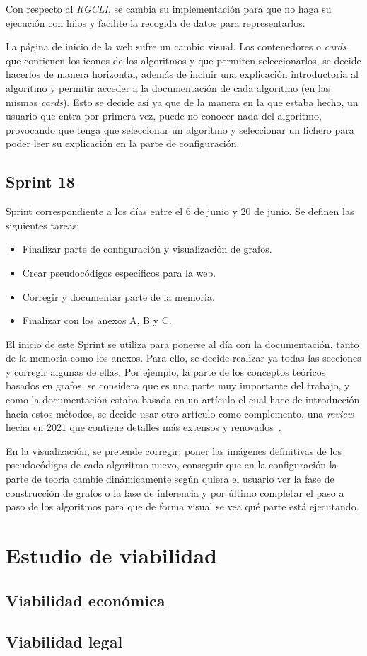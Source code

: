 Con respecto al \textit{RGCLI}, se cambia su implementación para que no haga su ejecución con hilos y facilite la recogida de datos para representarlos.

La página de inicio de la web sufre un cambio visual. Los contenedores o \textit{cards} que contienen los iconos de los algoritmos y que permiten seleccionarlos, se decide hacerlos de manera horizontal, además de incluir una explicación introductoria al algoritmo y permitir acceder a la documentación de cada algoritmo (en las mismas \textit{cards}). Esto se decide así ya que de la manera en la que estaba hecho, un usuario que entra por primera vez, puede no conocer nada del algoritmo, provocando que tenga que seleccionar un algoritmo y seleccionar un fichero para poder leer su explicación en la parte de configuración.

\subsection{Sprint 18}
Sprint correspondiente a los días entre el 6 de junio y 20 de junio. Se definen las siguientes tareas:
\begin{itemize}
	\item Finalizar parte de configuración y visualización de grafos.
	\item Crear pseudocódigos específicos para la web.
	\item Corregir y documentar parte de la memoria.
	\item Finalizar con los anexos A, B y C.
\end{itemize}

El inicio de este Sprint se utiliza para ponerse al día con la documentación, tanto de la memoria como los anexos. Para ello, se decide realizar ya todas las secciones y corregir algunas de ellas. Por ejemplo, la parte de los conceptos teóricos basados en grafos, se considera que es una parte muy importante del trabajo, y como la documentación estaba basada en un artículo el cual hace de introducción hacia estos métodos, se decide usar otro artículo como complemento, una \textit{review} hecha en 2021 que contiene detalles más extensos y renovados~\cite{GSSL:review}.

En la visualización, se pretende corregir: poner las imágenes definitivas de los pseudocódigos de cada algoritmo nuevo, conseguir que en la configuración la parte de teoría cambie dinámicamente según quiera el usuario ver la fase de construcción de grafos o la fase de inferencia y por último completar el paso a paso de los algoritmos para que de forma visual se vea qué parte está ejecutando.


\section{Estudio de viabilidad}

\subsection{Viabilidad económica}

\subsection{Viabilidad legal}

